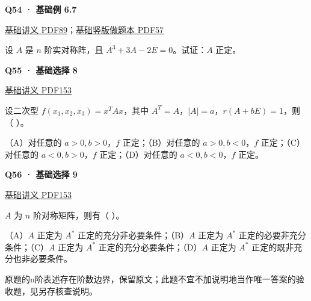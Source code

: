 \documentclass[UTF8,fontset=fandol,11pt,a4paper]{ctexart}
\newcommand{\source}[1]{{\footnotesize\color{Muted}#1\par}}
\newcommand{\qtitle}[2]{\par\needspace{5\baselineskip}\hypertarget{#1}{}\label{#1}\textbf{#2}\par}
\begin{document}
\begin{minipage}{\linewidth}
\qtitle{B-EX-07}{Q54 · 基础例 6.7}
\source{\href{file:///Users/skyintelligence/Desktop/\%E5\%BE\%97\%E8\%AF\%BB\%E4\%B8\%AA\%E7\%A0\%94-\%E5\%8C\%97\%E5\%A4\%A7\%E8\%BD\%AF\%E5\%BE\%AE/\%E6\%95\%B0\%E5\%AD\%A6\%20150/\%E8\%AE\%B2\%E4\%B9\%89/\%E3\%80\%90\%E4\%B8\%80\%E9\%AB\%98\%E6\%95\%B0Kira\%E3\%80\%9127\%E8\%80\%83\%E7\%A0\%94\%E7\%BA\%BF\%E4\%BB\%A3\%E5\%9F\%BA\%E7\%A1\%80\%E8\%AE\%B2\%E4\%B9\%89\%26\%E4\%B9\%A0\%E9\%A2\%98-\%E7\%94\%B5\%E5\%AD\%90\%E7\%89\%88.pdf\#page=89}{基础讲义 PDF89}；\href{file:///Users/skyintelligence/Desktop/\%E5\%BE\%97\%E8\%AF\%BB\%E4\%B8\%AA\%E7\%A0\%94-\%E5\%8C\%97\%E5\%A4\%A7\%E8\%BD\%AF\%E5\%BE\%AE/\%E6\%95\%B0\%E5\%AD\%A6\%20150/\%E8\%AE\%B2\%E4\%B9\%89/\%E3\%80\%90\%E7\%AB\%96\%E7\%89\%88\%E3\%80\%9127\%E8\%80\%83\%E7\%A0\%94Kira\%E7\%BA\%BF\%E4\%BB\%A3\%E5\%9F\%BA\%E7\%A1\%80\%E8\%AE\%B2\%E4\%B9\%89\%E5\%81\%9A\%E9\%A2\%98\%E6\%9C\%AC\%281\%29.pdf\#page=57}{基础竖版做题本 PDF57}}
设 $A$ 是 $n$ 阶实对称阵，且 $A^3+3A-2E=0$。试证：$A$ 正定。
\end{minipage}\par\vspace{7mm}
\begin{minipage}{\linewidth}
\qtitle{B-MC-08}{Q55 · 基础选择 8}
\source{\href{file:///Users/skyintelligence/Desktop/\%E5\%BE\%97\%E8\%AF\%BB\%E4\%B8\%AA\%E7\%A0\%94-\%E5\%8C\%97\%E5\%A4\%A7\%E8\%BD\%AF\%E5\%BE\%AE/\%E6\%95\%B0\%E5\%AD\%A6\%20150/\%E8\%AE\%B2\%E4\%B9\%89/\%E3\%80\%90\%E4\%B8\%80\%E9\%AB\%98\%E6\%95\%B0Kira\%E3\%80\%9127\%E8\%80\%83\%E7\%A0\%94\%E7\%BA\%BF\%E4\%BB\%A3\%E5\%9F\%BA\%E7\%A1\%80\%E8\%AE\%B2\%E4\%B9\%89\%26\%E4\%B9\%A0\%E9\%A2\%98-\%E7\%94\%B5\%E5\%AD\%90\%E7\%89\%88.pdf\#page=153}{基础讲义 PDF153}}
设二次型 $f(x_1,x_2,x_3)=x^TAx$，其中 $A^T=A$，$|A|=a$，$r(A+bE)=1$，则（ ）。

（A）对任意的 $a>0,b>0$，$f$ 正定；（B）对任意的 $a>0,b<0$，$f$ 正定；（C）对任意的 $a<0,b>0$，$f$ 正定；（D）对任意的 $a<0,b<0$，$f$ 正定。
\end{minipage}\par\vspace{7mm}
\begin{minipage}{\linewidth}
\qtitle{B-MC-09}{Q56 · 基础选择 9}
\source{\href{file:///Users/skyintelligence/Desktop/\%E5\%BE\%97\%E8\%AF\%BB\%E4\%B8\%AA\%E7\%A0\%94-\%E5\%8C\%97\%E5\%A4\%A7\%E8\%BD\%AF\%E5\%BE\%AE/\%E6\%95\%B0\%E5\%AD\%A6\%20150/\%E8\%AE\%B2\%E4\%B9\%89/\%E3\%80\%90\%E4\%B8\%80\%E9\%AB\%98\%E6\%95\%B0Kira\%E3\%80\%9127\%E8\%80\%83\%E7\%A0\%94\%E7\%BA\%BF\%E4\%BB\%A3\%E5\%9F\%BA\%E7\%A1\%80\%E8\%AE\%B2\%E4\%B9\%89\%26\%E4\%B9\%A0\%E9\%A2\%98-\%E7\%94\%B5\%E5\%AD\%90\%E7\%89\%88.pdf\#page=153}{基础讲义 PDF153}}
$A$ 为 $n$ 阶对称矩阵，则有（ ）。

（A）$A$ 正定为 $A^*$ 正定的充分非必要条件；（B）$A$ 正定为 $A^*$ 正定的必要非充分条件；（C）$A$ 正定为 $A^*$ 正定的充分必要条件；（D）$A$ 正定为 $A^*$ 正定的既非充分也非必要条件。
\source{原题的n阶表述存在阶数边界，保留原文；此题不宜不加说明地当作唯一答案的验收题，见另存核查说明。}
\end{minipage}\par\vspace{7mm}
\end{document}
